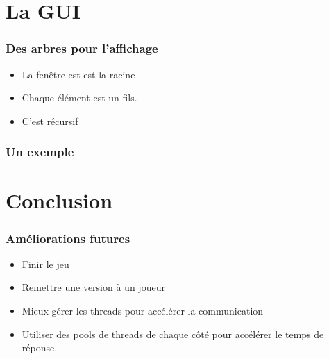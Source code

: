 \documentclass[pdf]{beamer}
\begin{document}
\section{La GUI}
\begin{frame}
    \frametitle{Des arbres pour l'affichage}
    \begin{itemize}
        \item La fenêtre est est la racine
        \item Chaque élément est un fils.
        \item C'est récursif
    \end{itemize}
\end{frame}

\begin{frame}[fragile]
    \frametitle{Un exemple}
    
\end{frame}
\section{Conclusion}

\begin{frame}

    \frametitle{Améliorations futures}
    \begin{itemize}
        \item Finir le jeu
        \item Remettre une version à un joueur
        \item Mieux gérer les threads pour accélérer la communication
        \item Utiliser des pools de threads de chaque côté pour accélérer
            le temps de réponse.
    \end{itemize}
\end{frame}
\end{document}
